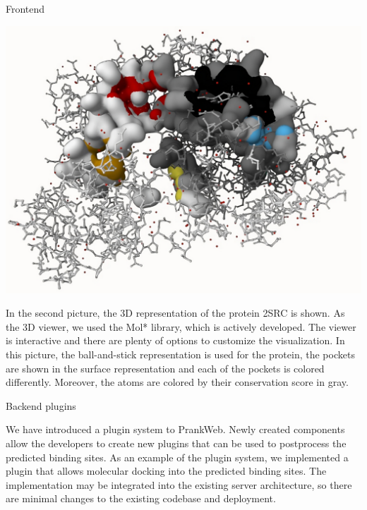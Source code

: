 \documentclass[portrait,a0paper,fontscale=0.25]{baposter}
\begin{document}
\begin{poster}
\begin{posterbox}[column=1, name=result1]{Frontend}
\begin{center}
	\includegraphics[width=0.8\linewidth]{img/molstar.pdf}
\end{center}

In the second picture, the 3D representation of the protein 2SRC is shown.
As the 3D viewer, we used the Mol* library, which is actively developed.
The viewer is interactive and there are plenty of options to customize the visualization.
In this picture, the ball-and-stick representation is used for the protein, the pockets are shown in the surface representation and each of the pockets is colored differently. Moreover, the atoms are colored by their conservation score in gray.

\end{posterbox}

\begin{posterbox}[column=1, name=result2, below=result1,
headerColorOne=violet!90!blue!60, boxColorOne=violet!15]{Backend plugins}

We have introduced a plugin system to PrankWeb. Newly created components allow the developers to create new plugins that can be used to postprocess the predicted binding sites. As an example of the plugin system, we implemented a plugin that allows molecular docking into the predicted binding sites.
The implementation may be integrated into the existing server architecture, so there are minimal changes to the existing codebase and deployment.

\end{posterbox}


\end{poster}
\end{document}
